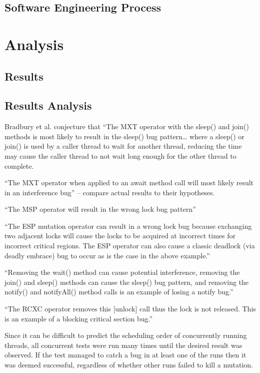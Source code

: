 \documentclass[a4paper,12pt]{article}
\begin{document}
    \subsection{Software Engineering Process}
	

\newpage	
\section{Analysis}
    \subsection{Results}
    

\subsection{Results Analysis}

Bradbury et al. conjecture that “The MXT operator with the sleep() and join() methods is most likely to result in the sleep() bug pattern… where a sleep() or join() is used by a caller thread to wait for another thread, reducing the time may cause the caller thread to not wait long enough for the other thread to complete.  

“The MXT operator when applied to an await method call will most likely result in an interference bug” – compare actual results to their hypotheses.

“The MSP operator will result in the wrong lock bug pattern”

“The ESP mutation operator can result in a wrong lock bug because exchanging two adjacent locks will cause the locks to be acquired at incorrect times for incorrect critical regions. The ESP operator can also cause a classic deadlock (via deadly embrace) bug to occur as is the case in the above example.”

“Removing the wait() method can cause potential interference, removing the join() and sleep() methods can cause the sleep() bug pattern, and removing the notify() and notifyAll() method calls is an example of losing a notify bug.”

“The RCXC operator removes this [unlock] call thus the lock is not released. This is an example of a blocking critical section bug.”

Since it can be difficult to predict the scheduling order of concurrently running threads, all concurrent tests were run many times until the desired result was observed. If the test managed to catch a bug in at least one of the runs then it was deemed successful, regardless of whether other runs failed to kill a mutation.     
    
\end{document}
